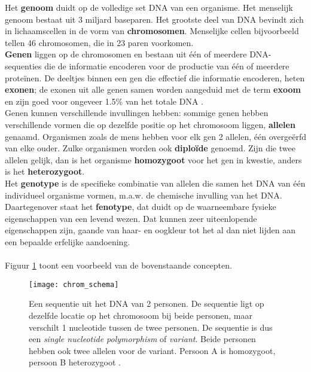 Het \textbf{genoom} duidt op de volledige set DNA van een organisme. Het menselijk genoom bestaat uit 3 miljard baseparen. Het grootste deel van DNA bevindt zich in lichaamscellen in de vorm van \textbf{chromosomen}. Menselijke cellen bijvoorbeeld tellen 46 chromosomen, die in 23 paren voorkomen.\\
\textbf{Genen} liggen op de chromosomen en bestaan uit \'e\'en of meerdere DNA-sequenties die de informatie encoderen voor de productie van \'e\'en of meerdere prote\"inen. De deeltjes binnen een gen die effectief die informatie encoderen, heten \textbf{exonen}; de exonen uit alle genen samen worden aangeduid met de term \textbf{exoom} en zijn goed voor ongeveer 1.5\% van het totale DNA \cite{broad_exome}.\\
Genen kunnen verschillende invullingen hebben: sommige genen hebben verschillende vormen die op dezelfde positie op het chromosoom liggen, \textbf{allelen} genaamd. Organismen zoals de mens hebben voor elk gen 2 allelen, \'e\'en overge\"erfd van elke ouder. Zulke organismen worden ook \textbf{diplo\"ide} genoemd. Zijn die twee allelen gelijk, dan is het organisme \textbf{homozygoot} voor het gen in kwestie, anders is het \textbf{heterozygoot}.\\
Het \textbf{genotype} is de specifieke combinatie van allelen die samen het DNA van \'e\'en individueel organisme vormen, m.a.w. de chemische invulling van het DNA. Daartegenover staat het \textbf{fenotype}, dat duidt op de waarneembare fysieke eigenschappen van een levend wezen. Dat kunnen zeer uiteenlopende eigenschappen zijn, gaande van haar- en oogkleur tot het al dan niet lijden aan een bepaalde erfelijke aandoening.\\\\
Figuur \ref{chrom_schema} toont een voorbeeld van de bovenstaande concepten.

\begin{figure}[!hb]
\texttt{[image: chrom\_schema]}
\caption{Een sequentie uit het DNA van 2 personen. De sequentie ligt op dezelfde locatie op het chromosoom bij beide personen, maar verschilt 1 nucleotide tussen de twee personen. De sequentie is dus een \textit{single nucleotide polymorphism} of \textit{variant}. Beide personen hebben ook twee allelen voor de variant. Persoon A is homozygoot, persoon B heterozygoot \cite{chrom_clipart}.}
\label{chrom_schema}
\end{figure}

